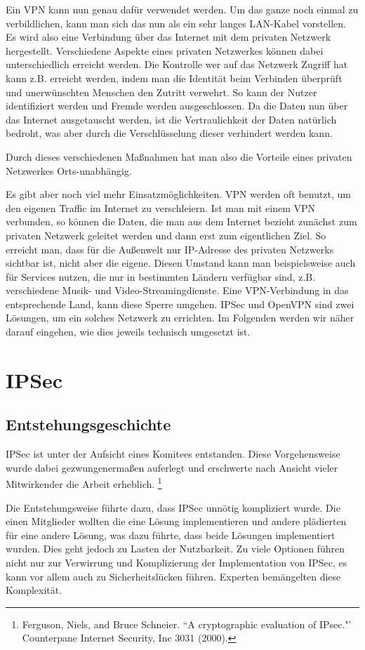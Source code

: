 \documentclass[12pt]{scrartcl}
\begin{document}
Ein VPN kann nun genau dafür verwendet werden. Um das ganze noch einmal zu verbildlichen, kann man sich das nun als ein sehr langes LAN-Kabel vorstellen. Es wird also eine Verbindung über das Internet mit dem privaten Netzwerk hergestellt. Verschiedene Aspekte eines privaten Netzwerkes können dabei unterschiedlich erreicht werden. Die Kontrolle wer auf das Netzwerk Zugriff hat kann z.B. erreicht werden, indem man die Identität beim Verbinden überprüft und unerwünschten Menschen den Zutritt verwehrt. So kann der Nutzer identifiziert werden und Fremde werden ausgeschlossen. Da die Daten nun über das Internet ausgetauscht werden, ist die Vertraulichkeit der Daten natürlich bedroht, was aber durch die Verschlüsselung dieser verhindert werden kann.

Durch dieses verschiedenen Maßnahmen hat man also die Vorteile eines privaten Netzwerkes Orts-unabhängig.

Es gibt aber noch viel mehr Einsatzmöglichkeiten. 
VPN werden oft benutzt, um den eigenen Traffic im Internet zu verschleiern. Ist man mit einem VPN verbunden, so können die Daten, die man aus dem Internet bezieht zunächst zum privaten Netzwerk geleitet werden und dann erst zum eigentlichen Ziel. So erreicht man, dass für die Außenwelt nur IP-Adresse des privaten Netzwerks sichtbar ist, nicht aber die eigene.
Diesen Umstand kann man beispielsweise auch für Services nutzen, die nur in bestimmten Ländern verfügbar sind, z.B. verschiedene Musik- und Video-Streamingdienste. Eine VPN-Verbindung in das entsprechende Land, kann diese Sperre umgehen. 
IPSec und OpenVPN sind zwei Lösungen, um ein solches Netzwerk zu errichten. Im Folgenden werden wir näher darauf eingehen, wie dies jeweils technisch umgesetzt ist.

\section{IPSec}
\subsection{Entstehungsgeschichte}
IPSec ist unter der Aufsicht eines Komitees entstanden. Diese Vorgehensweise wurde dabei gezwungenermaßen auferlegt und erschwerte nach Ansicht vieler Mitwirkender die Arbeit erheblich. \footnote{Ferguson, Niels, and Bruce Schneier. ``A cryptographic evaluation of IPsec."' Counterpane Internet Security, Inc 3031 (2000).} 

Die Entstehungsweise führte dazu, dass IPSec unnötig kompliziert wurde. Die einen Mitglieder wollten die eine Lösung implementieren und andere plädierten für eine andere Lösung, was dazu führte, dass beide Lösungen implementiert wurden. Dies geht jedoch zu Lasten der Nutzbarkeit. Zu viele Optionen führen nicht nur zur Verwirrung und Komplizierung der Implementation von IPSec, es kann vor allem auch zu Sicherheitslücken führen. Experten bemängelten diese Komplexität.
\end{document}
